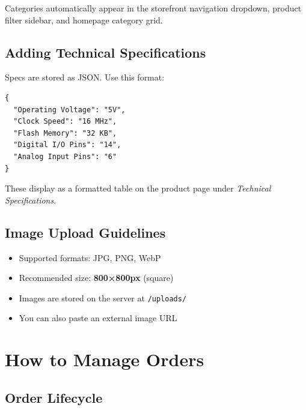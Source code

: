 \documentclass[12pt,a4paper]{article}
\begin{document}
Categories automatically appear in the storefront navigation dropdown, product filter sidebar, and homepage category grid.

\subsection{Adding Technical Specifications}

Specs are stored as JSON. Use this format:

\begin{lstlisting}[language={}]
{
  "Operating Voltage": "5V",
  "Clock Speed": "16 MHz",
  "Flash Memory": "32 KB",
  "Digital I/O Pins": "14",
  "Analog Input Pins": "6"
}
\end{lstlisting}

These display as a formatted table on the product page under \textit{Technical Specifications}.

\subsection{Image Upload Guidelines}

\begin{itemize}[leftmargin=1.5em, itemsep=3pt]
  \item Supported formats: JPG, PNG, WebP
  \item Recommended size: \textbf{800×800px} (square)
  \item Images are stored on the server at \texttt{/uploads/}
  \item You can also paste an external image URL
\end{itemize}

\section{How to Manage Orders}

\subsection{Order Lifecycle}

\begin{center}
\end{center}
\end{document}
